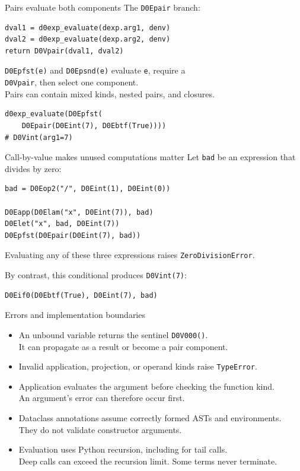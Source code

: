 \documentclass[aspectratio=169,11pt]{beamer}
\begin{document}
\begin{frame}[fragile]{Pairs evaluate both components}
The \texttt{D0Epair} branch:
\begin{lstlisting}
dval1 = d0exp_evaluate(dexp.arg1, denv)
dval2 = d0exp_evaluate(dexp.arg2, denv)
return D0Vpair(dval1, dval2)
\end{lstlisting}
\medskip
\texttt{D0Epfst(e)} and \texttt{D0Epsnd(e)} evaluate \texttt{e}, require a\\
\texttt{D0Vpair}, then select one component.\\[0.7em]
Pairs can contain mixed kinds, nested pairs, and closures.
\begin{lstlisting}
d0exp_evaluate(D0Epfst(
    D0Epair(D0Eint(7), D0Ebtf(True))))
# D0Vint(arg1=7)
\end{lstlisting}
\end{frame}

\begin{frame}[fragile]{Call-by-value makes unused computations matter}
Let \texttt{bad} be an expression that divides by zero:
\begin{lstlisting}
bad = D0Eop2("/", D0Eint(1), D0Eint(0))

D0Eapp(D0Elam("x", D0Eint(7)), bad)
D0Elet("x", bad, D0Eint(7))
D0Epfst(D0Epair(D0Eint(7), bad))
\end{lstlisting}
Evaluating any of these three expressions raises \texttt{ZeroDivisionError}.
\par
\bigskip
By contrast, this conditional produces \texttt{D0Vint(7)}:
\begin{lstlisting}
D0Eif0(D0Ebtf(True), D0Eint(7), bad)
\end{lstlisting}
\end{frame}

\begin{frame}{Errors and implementation boundaries}
\begin{itemize}
\item An unbound variable returns the sentinel \texttt{D0V000()}.\\
It can propagate as a result or become a pair component.
\item Invalid application, projection, or operand kinds raise \texttt{TypeError}.
\item Application evaluates the argument before checking the function kind.\\
An argument's error can therefore occur first.
\item Dataclass annotations assume correctly formed ASTs and environments.\\
They do not validate constructor arguments.
\item Evaluation uses Python recursion, including for tail calls.\\
Deep calls can exceed the recursion limit. Some terms never terminate.
\end{itemize}
\end{frame}
\end{document}
